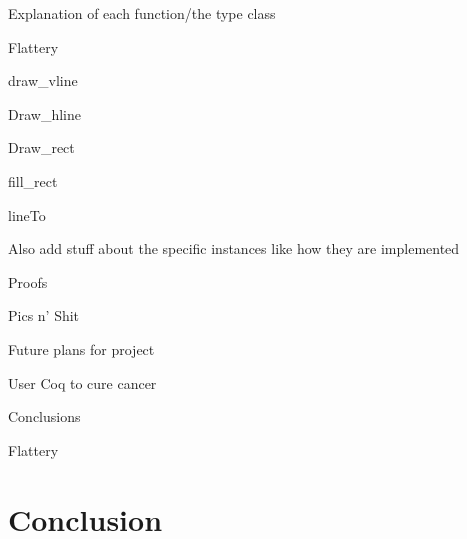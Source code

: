 \documentclass{llncs}
\begin{document}
Explanation of each function/the type class

Flattery

draw\_vline

Draw\_hline

Draw\_rect

fill\_rect

lineTo

Also add stuff about the specific instances like how they are implemented

Proofs

Pics n’ Shit 

Future plans for project

User Coq to cure cancer 

Conclusions

Flattery













\section{Conclusion}






\end{document}

